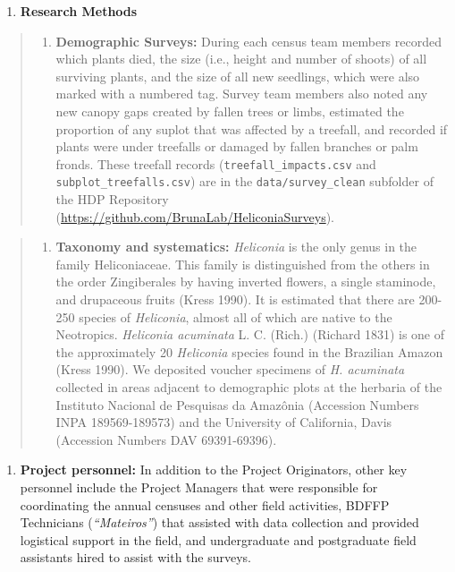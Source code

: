 \documentclass[
  man, donotrepeattitle,floatsintext]{apa6}
\providecommand{\tightlist}{%
  \setlength{\itemsep}{0pt}\setlength{\parskip}{0pt}}
\begin{document}
\begin{enumerate}
\def\labelenumi{\arabic{enumi}.}
\setcounter{enumi}{2}
\tightlist
\item
  \textbf{Research Methods}
\end{enumerate}

\begin{quote}
\begin{enumerate}
\def\labelenumi{\alph{enumi}.}
\tightlist
\item
  \textbf{Demographic Surveys:} During each census team members recorded which plants died, the size (i.e., height and number of shoots) of all surviving plants, and the size of all new seedlings, which were also marked with a numbered tag. Survey team members also noted any new canopy gaps created by fallen trees or limbs, estimated the proportion of any suplot that was affected by a treefall, and recorded if plants were under treefalls or damaged by fallen branches or palm fronds. These treefall records (\texttt{treefall\_impacts.csv} and \texttt{subplot\_treefalls.csv}) are in the \texttt{data/survey\_clean} subfolder of the HDP Repository (\url{https://github.com/BrunaLab/HeliconiaSurveys}).
\end{enumerate}
\end{quote}

\begin{quote}
\begin{enumerate}
\def\labelenumi{\alph{enumi}.}
\setcounter{enumi}{1}
\tightlist
\item
  \textbf{Taxonomy and systematics:} \emph{Heliconia} is the only genus in the family Heliconiaceae. This family is distinguished from the others in the order Zingiberales by having inverted flowers, a single staminode, and drupaceous fruits (Kress 1990). It is estimated that there are 200-250 species of \emph{Heliconia}, almost all of which are native to the Neotropics. \emph{Heliconia acuminata} L. C. (Rich.) (Richard 1831) is one of the approximately 20 \emph{Heliconia} species found in the Brazilian Amazon (Kress 1990). We deposited voucher specimens of \emph{H. acuminata} collected in areas adjacent to demographic plots at the herbaria of the Instituto Nacional de Pesquisas da Amazônia (Accession Numbers INPA 189569-189573) and the University of California, Davis (Accession Numbers DAV 69391-69396).
\end{enumerate}
\end{quote}

\begin{enumerate}
\def\labelenumi{\arabic{enumi}.}
\setcounter{enumi}{3}
\tightlist
\item
  \textbf{Project personnel:} In addition to the Project Originators, other key personnel include the Project Managers that were responsible for coordinating the annual censuses and other field activities, BDFFP Technicians (\emph{``Mateiros''}) that assisted with data collection and provided logistical support in the field, and undergraduate and postgraduate field assistants hired to assist with the surveys.
\end{enumerate}
\end{document}
